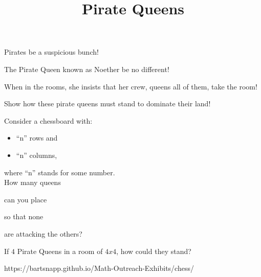 \documentclass{../exhibit}
\title{Pirate Queens}
\begin{document}
\begin{context}
  Pirates be a suspicious bunch!


  The Pirate Queen known as Noether be no different!


  When in the rooms, she insists that her crew, queens all of them, take the room!

    
  Show how these pirate queens must stand to dominate their land!
\end{context}



\begin{directions}
  Consider a chessboard with:
  \begin{itemize}
  \item ``n'' rows and
  \item ``n'' columns,
  \end{itemize}
  where ``n'' stands for some number.
  \\[1cm] How many queens

  can you place


  so that none


  are attacking the others?
\end{directions}



\begin{example}
 If $4$ Pirate Queens in a room of $4x4$, how could they stand?
\begin{center}
\end{center}
\end{example}



\begin{mathConnections}
  https://bartsnapp.github.io/Math-Outreach-Exhibits/chess/
\end{mathConnections}
\end{document}
